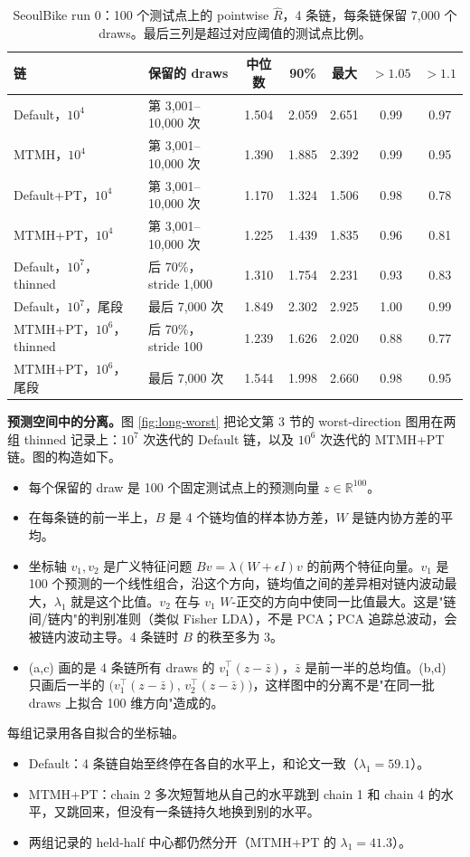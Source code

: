 \documentclass[11pt]{article}
\newcommand{\Rhat}{\hat R}
\begin{document}
\begin{table}[h]
\centering
\small
\caption{SeoulBike run 0：100 个测试点上的 pointwise $\Rhat$，4 条链，每条链保留 7,000 个 draws。最后三列是超过对应阈值的测试点比例。}
\label{tab:long-pt}
\begin{tabular}{llccccc}
\toprule
链 & 保留的 draws & 中位数 & 90\% & 最大 & $>1.05$ & $>1.1$ \\
\midrule
Default，$10^4$ & 第 3,001--10,000 次 & 1.504 & 2.059 & 2.651 & 0.99 & 0.97 \\
MTMH，$10^4$ & 第 3,001--10,000 次 & 1.390 & 1.885 & 2.392 & 0.99 & 0.95 \\
Default+PT，$10^4$ & 第 3,001--10,000 次 & 1.170 & 1.324 & 1.506 & 0.98 & 0.78 \\
MTMH+PT，$10^4$ & 第 3,001--10,000 次 & 1.225 & 1.439 & 1.835 & 0.96 & 0.81 \\
Default，$10^7$，thinned & 后 70\%，stride 1,000 & 1.310 & 1.754 & 2.231 & 0.93 & 0.83 \\
Default，$10^7$，尾段 & 最后 7,000 次 & 1.849 & 2.302 & 2.925 & 1.00 & 0.99 \\
MTMH+PT，$10^6$，thinned & 后 70\%，stride 100 & 1.239 & 1.626 & 2.020 & 0.88 & 0.77 \\
MTMH+PT，$10^6$，尾段 & 最后 7,000 次 & 1.544 & 1.998 & 2.660 & 0.98 & 0.95 \\
\bottomrule
\end{tabular}
\end{table}

\textbf{预测空间中的分离。}图 \ref{fig:long-worst} 把论文第 3 节的 worst-direction 图用在两组 thinned 记录上：$10^7$ 次迭代的 Default 链，以及 $10^6$ 次迭代的 MTMH+PT 链。图的构造如下。
\begin{itemize}
\item 每个保留的 draw 是 100 个固定测试点上的预测向量 $z\in\mathbb R^{100}$。
\item 在每条链的前一半上，$B$ 是 4 个链均值的样本协方差，$W$ 是链内协方差的平均。
\item 坐标轴 $v_1,v_2$ 是广义特征问题 $Bv=\lambda(W+\epsilon I)v$ 的前两个特征向量。$v_1$ 是 100 个预测的一个线性组合，沿这个方向，链均值之间的差异相对链内波动最大，$\lambda_1$ 就是这个比值。$v_2$ 在与 $v_1$ $W$-正交的方向中使同一比值最大。这是"链间/链内"的判别准则（类似 Fisher LDA），不是 PCA；PCA 追踪总波动，会被链内波动主导。4 条链时 $B$ 的秩至多为 3。
\item (a,c) 画的是 4 条链所有 draws 的 $v_1^\top(z-\bar z)$，$\bar z$ 是前一半的总均值。(b,d) 只画后一半的 $\bigl(v_1^\top(z-\bar z),\,v_2^\top(z-\bar z)\bigr)$，这样图中的分离不是"在同一批 draws 上拟合 100 维方向"造成的。
\end{itemize}
每组记录用各自拟合的坐标轴。
\begin{itemize}
\item Default：4 条链自始至终停在各自的水平上，和论文一致（$\lambda_1=59.1$）。
\item MTMH+PT：chain 2 多次短暂地从自己的水平跳到 chain 1 和 chain 4 的水平，又跳回来，但没有一条链持久地换到别的水平。
\item 两组记录的 held-half 中心都仍然分开（MTMH+PT 的 $\lambda_1=41.3$）。
\end{itemize}
\end{document}
